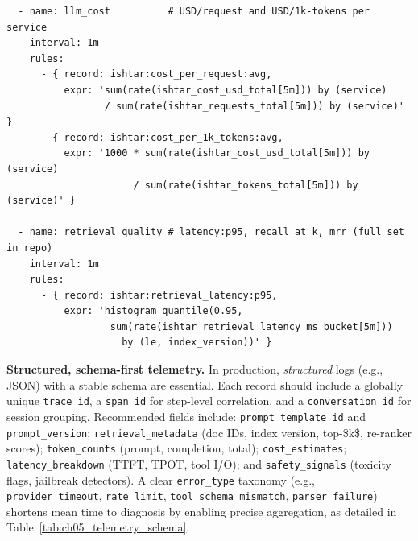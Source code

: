 \begin{codebox}
\begin{verbatim}
  - name: llm_cost          # USD/request and USD/1k-tokens per service
    interval: 1m
    rules:
      - { record: ishtar:cost_per_request:avg,
          expr: 'sum(rate(ishtar_cost_usd_total[5m])) by (service)
                 / sum(rate(ishtar_requests_total[5m])) by (service)' }
      - { record: ishtar:cost_per_1k_tokens:avg,
          expr: '1000 * sum(rate(ishtar_cost_usd_total[5m])) by (service)
                      / sum(rate(ishtar_tokens_total[5m])) by (service)' }

  - name: retrieval_quality # latency:p95, recall_at_k, mrr (full set in repo)
    interval: 1m
    rules:
      - { record: ishtar:retrieval_latency:p95,
          expr: 'histogram_quantile(0.95,
                  sum(rate(ishtar_retrieval_latency_ms_bucket[5m]))
                    by (le, index_version))' }
\end{verbatim}
\end{codebox}

\medskip
\noindent\textbf{Structured, schema-first telemetry.}
In production, \emph{structured} logs (e.g., JSON) with a stable schema are essential. Each record should include a globally unique \texttt{trace\_id}, a \texttt{span\_id} for step-level correlation, and a \texttt{conversation\_id} for session grouping. Recommended fields include: \texttt{prompt\_template\_id} and \texttt{prompt\_version}; \texttt{retrieval\_metadata} (doc IDs, index version, top-\$k\$, re-ranker scores); \texttt{token\_counts} (prompt, completion, total); \texttt{cost\_estimates}; \texttt{latency\_breakdown} (TTFT, TPOT, tool I/O); and \texttt{safety\_signals} (toxicity flags, jailbreak detectors). A clear \texttt{error\_type} taxonomy (e.g., \texttt{provider\_timeout}, \texttt{rate\_limit}, \texttt{tool\_schema\_mismatch}, \texttt{parser\_failure}) shortens mean time to diagnosis by enabling precise aggregation, as detailed in Table~\ref{tab:ch05_telemetry_schema}.

